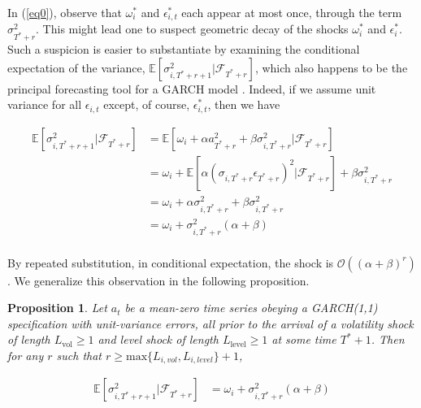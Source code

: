 \documentclass[11pt]{article}
\newtheorem{prop}{Proposition}
\theoremstyle{definition}
\begin{document}
In (\ref{eq0}), observe that $\omega_{i}^{*}$ and $\epsilon^{*}_{i,t}$ each appear at most once, through the term $\sigma^{2}_{T^{*}+r}$.  This might lead one to suspect  geometric decay of the shocks $\omega_{i}^{*}$ and $\epsilon^{*}_{i}$.  Such a suspicion is easier to substantiate by examining the conditional expectation of the variance, $\mathbb{E}[ \sigma^{2}_{i,T^{*}+r+1} |\mathcal{F}_{T^{*}+r}]$, which also happens to be the principal forecasting tool for a GARCH model \citep{zivot2009practical}.  Indeed, if we assume unit variance for all $\epsilon_{i,t}$ except, of course, $\epsilon^{*}_{i,t}$, then we have 

\begin{align*}
\mathbb{E}[ \sigma^{2}_{i,T^{*}+r+1} |\mathcal{F}_{T^{*}+r}] & = \mathbb{E}[\omega_{i} + \alpha a_{T^{*}+r}^{2} + \beta\sigma^{2}_{i,T^{*}+r} |\mathcal{F}_{T^{*}+r}] \\
& = \omega_{i} + \mathbb{E}[\alpha(\sigma_{i,T^{*}+r}\epsilon_{T^{*}+r})^{2} |\mathcal{F}_{T^{*}+r}] + \beta\sigma^{2}_{i,T^{*}+r} \\
& = \omega_{i} + \alpha\sigma_{i,T^{*}+r}^{2} + \beta\sigma^{2}_{i,T^{*}+r} \tag{Due to the unit variance assumption}\\
& = \omega_{i} + \sigma^{2}_{i,T^{*}+r}(\alpha + \beta) \\
\end{align*}

By repeated substitution, in conditional expectation, the shock is $\mathcal{O}((\alpha+\beta)^{r})$.  We generalize this observation in the following proposition.

\begin{prop}
Let $a_{t}$ be a mean-zero time series obeying a GARCH(1,1) specification with unit-variance errors, all prior to the arrival of a volatility shock of length $L_{\text{vol}} \geq 1$ and level shock of length $L_{\text{level}}\geq 1$ at some time $T^{*}+1$.  Then for any $r$ such that $r \geq \text{max}\{L_{i, vol},L_{i, level}\} + 1$, 

\begin{align}
\mathbb{E}[ \sigma^{2}_{i,T^{*}+r+1} |\mathcal{F}_{T^{*}+r}] & = \omega_{i} + \sigma^{2}_{i,T^{*}+r}(\alpha + \beta) \\
\end{align}
\end{prop}
\end{document}
